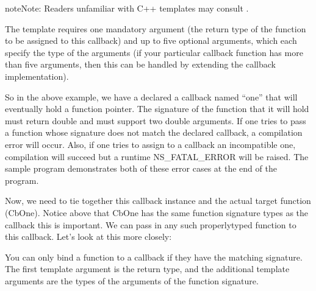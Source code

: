 \documentclass[letterpaper,10pt,english]{sphinxmanual}
\renewcommand{\sphinxcode}[1]{\texttt{\small{#1}}}
\begin{document}
\begin{sphinxadmonition}{note}{Note:}
Readers unfamiliar with C++ templates may consult .
\end{sphinxadmonition}

The \sphinxcode{} template requires one mandatory argument (the return type
of the function to be assigned to this callback) and up to five optional
arguments, which each specify the type of the arguments (if your particular
callback function has more than five arguments, then this can be handled
by extending the callback implementation).

So in the above example, we have a declared a callback named “one” that will
eventually hold a function pointer.  The signature of the function that it will
hold must return double and must support two double arguments.  If one tries
to pass a function whose signature does not match the declared callback,
a compilation error will occur.  Also, if one tries to assign to a callback
an incompatible one, compilation will succeed but a run\sphinxhyphen{}time
NS\_FATAL\_ERROR will be raised.  The sample program
\sphinxcode{\sphinxupquote{src/core/examples/main\sphinxhyphen{}callback.cc}} demonstrates both of these error cases
at the end of the \sphinxcode{} program.

Now, we need to tie together this callback instance and the actual target function
(CbOne).  Notice above that CbOne has the same function signature types as the
callback\textendash{} this is important.  We can pass in any such properly\sphinxhyphen{}typed function
to this callback.  Let’s look at this more closely:

\begin{sphinxVerbatim}[commandchars=\\\{\}]
         
                                 
                                 
                                 
           
\end{sphinxVerbatim}

You can only bind a function to a callback if they have the matching signature.
The first template argument is the return type, and the additional template
arguments are the types of the arguments of the function signature.
\end{document}
